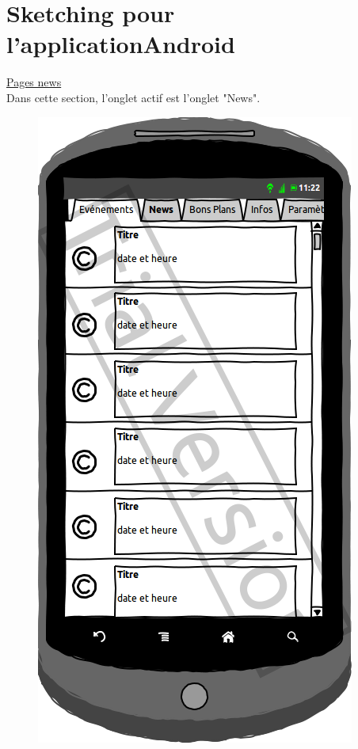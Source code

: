 \documentclass[a4paper, 11px]{article}
\begin{document}
\section{Sketching pour l'applicationAndroid}
\label{sketchAndroid}
\underline{Pages news}\\
Dans cette section, l'onglet actif est l'onglet "News".
\vfill
\begin{figure}[htbp]
	\begin{minipage}[c]{.50\linewidth}
		\begin{center}
			\includegraphics[scale=0.3]{../../Sketch/Android/News.png}
		\end{center}
	\end{minipage}
	\hfill
	\begin{minipage}[c]{.50\linewidth}

\end{minipage}
\end{figure}
\end{document}
